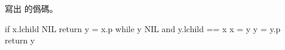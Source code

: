 \startEXERCISE
寫出  的僞碼。
\stopEXERCISE

\startANSWER
{}
\startCLRSCODE
if x.lchild \ne NIL
	return 
y = x.p
while y \ne NIL and y.lchild == x
	x = y
	y = y.p
return y
\stopCLRSCODE
\stopANSWER
